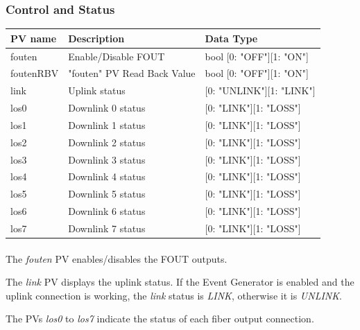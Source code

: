 \documentclass[openany]{article}
\begin{document}
	\etoclocalframed[1]{}

		\subsubsection{Control and Status}\label{pvgroup:fout-control-status}
			\begin{center}
			\begin{tabular}{| m{2.8cm} m{6cm} m{6cm} |}
			    \hline
			    \bfseries PV name & \bfseries Description & \bfseries Data Type \\ \hline
			    fouten & Enable/Disable FOUT & bool [0: "OFF"][1: "ON"] \\ \hline
			    foutenRBV & "fouten" PV Read Back Value & bool [0: "OFF"][1: "ON"] \\ \hline
			    link & Uplink status & [0: "UNLINK"][1: "LINK"] \\ \hline
			    los0 & Downlink 0 status & [0: "LINK"][1: "LOSS"] \\ \hline
			    los1 & Downlink 1 status & [0: "LINK"][1: "LOSS"] \\ \hline
			    los2 & Downlink 2 status & [0: "LINK"][1: "LOSS"] \\ \hline
			    los3 & Downlink 3 status & [0: "LINK"][1: "LOSS"] \\ \hline
			    los4 & Downlink 4 status & [0: "LINK"][1: "LOSS"] \\ \hline
			    los5 & Downlink 5 status & [0: "LINK"][1: "LOSS"] \\ \hline
			    los6 & Downlink 6 status & [0: "LINK"][1: "LOSS"] \\ \hline
			    los7 & Downlink 7 status & [0: "LINK"][1: "LOSS"] \\ \hline
			\end{tabular}
			\end{center}

			\paragraph{} The \emph{fouten} PV enables/disables the FOUT outputs.
			\par The \emph{link} PV displays the uplink status. If the Event Generator is enabled and the uplink connection is working, the \emph{link} status is \emph{LINK}, otherwise it is \emph{UNLINK}.
			\par The PVs \emph{los0} to \emph{los7} indicate the status of each fiber output connection.
\end{document}
